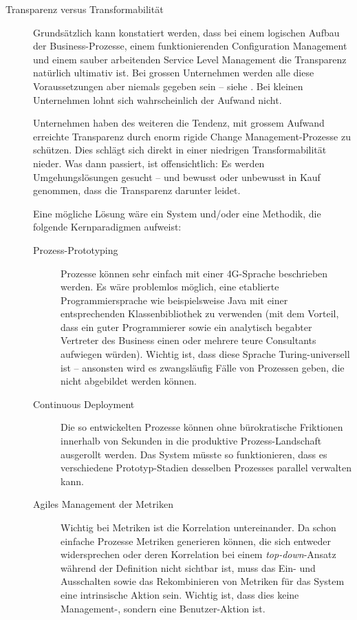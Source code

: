 \documentclass[11pt,listof=totoc]{scrreprt} %
\theoremstyle{definition}
\begin{document}
\begin{description}
\item[Transparenz versus Transformabilität]

Grundsätzlich kann konstatiert werden, dass bei einem logischen Aufbau der Business-Prozesse, einem funktionierenden Configuration Management und einem sauber arbeitenden Service Level Management die Transparenz natürlich ultimativ ist. Bei grossen Unternehmen werden alle diese Voraussetzungen aber niemals gegeben sein -- siehe \cite{skeptic}. Bei kleinen Unternehmen lohnt sich wahrscheinlich der Aufwand nicht.

Unternehmen haben des weiteren die Tendenz, mit grossem Aufwand erreichte Transparenz durch enorm rigide Change Management-Prozesse zu schützen. Dies schlägt sich direkt in einer niedrigen Transformabilität nieder. Was dann passiert, ist offensichtlich: Es werden Umgehungslösungen gesucht -- und bewusst oder unbewusst in Kauf genommen, dass die Transparenz darunter leidet.

Eine mögliche Lösung wäre ein System und/oder eine Methodik, die folgende Kernparadigmen aufweist:
\begin{description}
\item[Prozess-Prototyping] Prozesse können sehr einfach mit einer 4G-Sprache beschrieben werden. Es wäre problemlos möglich, eine etablierte Programmiersprache wie beispielsweise Java mit einer entsprechenden Klassenbibliothek zu verwenden (mit dem Vorteil, dass ein guter Programmierer sowie ein analytisch begabter Vertreter des Business einen oder mehrere teure Consultants aufwiegen würden). Wichtig ist, dass diese Sprache Turing-universell ist -- ansonsten wird es zwangsläufig Fälle von Prozessen geben, die nicht abgebildet werden können.
\item[Continuous Deployment] Die so entwickelten Prozesse können ohne bürokratische Friktionen innerhalb von Sekunden in die produktive Prozess-Landschaft ausgerollt werden. Das System müsste so funktionieren, dass es verschiedene Prototyp-Stadien desselben Prozesses parallel verwalten kann.
\item[Agiles Management der Metriken] Wichtig bei Metriken ist die Korrelation untereinander. Da schon einfache Prozesse Metriken generieren können, die sich entweder widersprechen oder deren Korrelation bei einem {\em top-down}-Ansatz während der Definition nicht sichtbar ist, muss das Ein- und Ausschalten sowie das Rekombinieren von Metriken für das System eine intrinsische Aktion sein. Wichtig ist, dass dies keine Management-, sondern eine Benutzer-Aktion ist.
\end{description}


\end{description}
\end{document}
